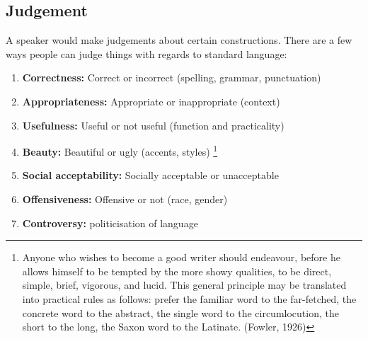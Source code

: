 \documentclass[../main.tex]{subfiles}
\begin{document}
        \subsection{Judgement}
        A speaker would make judgements about certain constructions. There are a few ways people can judge things with regards to standard language:
        \begin{enumerate}
            \item \textbf{Correctness:} Correct or incorrect (spelling, grammar, punctuation)
            \item \textbf{Appropriateness:} Appropriate or inappropriate (context)
            \item \textbf{Usefulness:} Useful or not useful (function and practicality)
            \item \textbf{Beauty:} Beautiful or ugly (accents, styles) \footnote{Anyone who wishes to become a good writer should endeavour, before he allows himself to be tempted by the more showy qualities, to be direct, simple, brief, vigorous, and lucid. This general principle may be translated into practical rules as follows: prefer the familiar word to the far-fetched, the concrete word to the abstract, the single word to the circumlocution, the short to the long, the Saxon word to the Latinate. (Fowler, 1926)}
            \item \textbf{Social acceptability:} Socially acceptable or unacceptable
            \item \textbf{Offensiveness:} Offensive or not (race, gender)
            \item \textbf{Controversy:} politicisation of language
        \end{enumerate}


\end{document}
